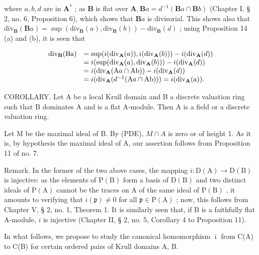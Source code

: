 where \(a, b, d\) are in \(\mathbf{A}^*\) ; as \(\mathbf{B}\) is flat over \(\mathbf{A}, \mathbf{B}a = d^{-1}(\mathbf{B}a \cap \mathbf{B}b)\) (Chapter I, § 2, no. 6, Proposition 6), which shows that \(\mathbf{B}a\) is divisorial. This shows also that \(\mathrm{div}_{\mathbf{B}}(\mathbf{B}a) = \sup (\mathrm{div}_{\mathbf{B}}(a), \mathrm{div}_{\mathbf{B}}(b)) - \mathrm{div}_{\mathbf{B}}(d)\) ; using Proposition 14 (a) and (b), it is seen that

\[
\begin{array}{r l} \operatorname{div} _ {\mathbf {B}} (\mathrm{Ba}) & = \sup (i (\operatorname{div} _ {\mathbf {A}} (a)), i (\operatorname{div} _ {\mathbf {A}} (b))) - i (\operatorname{div} _ {\mathbf {A}} (d)) \\ & = i (\sup (\operatorname{div} _ {\mathbf {A}} (a), \operatorname{div} _ {\mathbf {A}} (b))) - i (\operatorname{div} _ {\mathbf {A}} (d)) \\ & = i (\operatorname{div} _ {\mathbf {A}} (\mathrm{A} a \cap \mathrm{Ab})) - i (\operatorname{div} _ {\mathbf {A}} (d)) \\ & = i (\operatorname{div} _ {\mathbf {A}} (d ^ {- 1} (\mathrm{A} a \cap \mathrm{Ab}))) = i (\operatorname{div} _ {\mathbf {A}} (\mathrm{a})). \end{array}
\]

COROLLARY. Let A be a local Krull domain and B a discrete valuation ring such that B dominates A and is a flat A-module. Then A is a field or a discrete valuation ring.

Let M be the maximal ideal of B. By (PDE), \(M \cap A\) is zero or of height 1. As it is, by hypothesis the maximal ideal of A, our assertion follows from Proposition 11 of no. 7.

Remark. In the former of the two above cases, the mapping \(i\colon\mathrm{D}(\mathrm{A})\to\mathrm{D}(\mathrm{B})\) is injective: as the elements of \(\mathrm{P}(\mathrm{B})\) form a basis of \(\mathrm{D}(\mathrm{B})\) and two distinct ideals of \(\mathrm{P}(\mathrm{A})\) cannot be the traces on \(\mathrm{A}\) of the same ideal of \(\mathrm{P}(\mathrm{B})\) , it amounts to verifying that \(i(\mathfrak{p})\neq0\) for all \(\mathfrak{p}\in\mathrm{P}(\mathrm{A})\) ; now, this follows from Chapter V, § 2, no. 1, Theorem 1. It is similarly seen that, if \(\mathrm{B}\) is a faithfully flat A-module, \(i\) is injective (Chapter II, § 2, no. 5, Corollary 4 to Proposition 11).

In what follows, we propose to study the canonical homomorphism \(\bar{\imath}\) from C(A) to C(B) for certain ordered pairs of Krull domains A, B.

